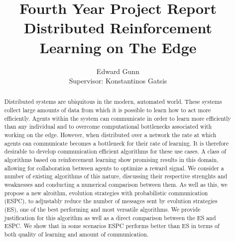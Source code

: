 \documentclass[letterpaper,11pt]{report}
\begin{document}
\title{Fourth Year Project Report \\ \textbf{Distributed Reinforcement Learning on The Edge}}
\author{Edward Gunn \\ Supervisor: Konstantinos Gatsis}
\maketitle 

\begin{abstract}
    Distributed systems are ubiquitous in the modern, automated world.
    These systems collect large amounts of data from which it is possible to learn how to act more efficiently.
    Agents within the system can communicate in order to learn more efficiently than any individual and to overcome computational bottlenecks associated with working on the edge.
    However, when distributed over a network the rate at which agents can communicate becomes a bottleneck for their rate of learning.
    It is therefore desirable to develop communication efficient algorithms for these use cases. A class of algorithms based on reinforcement learning show promising results in this domain, allowing for collaboration between agents to optimize a reward signal. We consider a number of existing algorithms of this nature, discussing their respective strenghts and weaknesses and conducting a numerical comparison between them. As well as this, we propose a new alroithm, evolution strategies with probabilistic communication (ESPC), to adjustably reduce the number of messages sent by evolution strategies (ES), one of the best performing and most versatile algorithms. We provide justification for this algorithm as well as a direct comparison between the ES and ESPC. We show that in some scenarios ESPC performs better than ES in terms of both quality of learning and amount of communication.
\end{abstract}

\tableofcontents











% 
\end{document}

